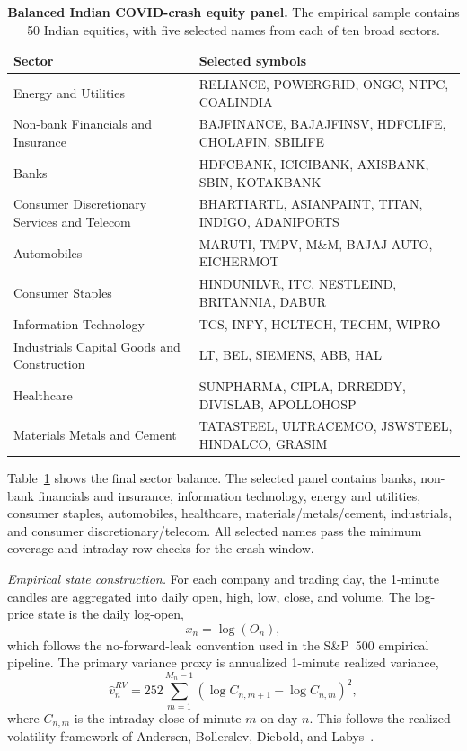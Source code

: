 \documentclass[reprint, amsmath, amssymb, aps, prl, superscriptaddress, nofootinbib]{revtex4-2}
\begin{document}
\begin{table}[t]
\centering
\caption{\textbf{Balanced Indian COVID-crash equity panel.}
The empirical sample contains 50 Indian equities, with five selected names from each of ten broad sectors.}
\label{tab:indian-company-selection}
\scriptsize
\begin{tabular}{ll}
\toprule
Sector & Selected symbols \\
\midrule
Energy and Utilities & RELIANCE, POWERGRID, ONGC, NTPC, COALINDIA \\
Non-bank Financials and Insurance & BAJFINANCE, BAJAJFINSV, HDFCLIFE, CHOLAFIN, SBILIFE \\
Banks & HDFCBANK, ICICIBANK, AXISBANK, SBIN, KOTAKBANK \\
Consumer Discretionary Services and Telecom & BHARTIARTL, ASIANPAINT, TITAN, INDIGO, ADANIPORTS \\
Automobiles & MARUTI, TMPV, M\&M, BAJAJ-AUTO, EICHERMOT \\
Consumer Staples & HINDUNILVR, ITC, NESTLEIND, BRITANNIA, DABUR \\
Information Technology & TCS, INFY, HCLTECH, TECHM, WIPRO \\
Industrials Capital Goods and Construction & LT, BEL, SIEMENS, ABB, HAL \\
Healthcare & SUNPHARMA, CIPLA, DRREDDY, DIVISLAB, APOLLOHOSP \\
Materials Metals and Cement & TATASTEEL, ULTRACEMCO, JSWSTEEL, HINDALCO, GRASIM \\
\bottomrule
\end{tabular}
\end{table}


Table~\ref{tab:indian-company-selection} shows the final sector balance. The selected panel contains banks, non-bank financials and insurance, information technology, energy and utilities, consumer staples, automobiles, healthcare, materials/metals/cement, industrials, and consumer discretionary/telecom. All selected names pass the minimum coverage and intraday-row checks for the crash window.



\textit{Empirical state construction.}
For each company and trading day, the 1-minute candles are aggregated into daily open, high, low, close, and volume. The log-price state is the daily log-open,
\begin{equation}
    x_n = \log(O_n),
\end{equation}
which follows the no-forward-leak convention used in the S\&P~500 empirical pipeline. The primary variance proxy is annualized 1-minute realized variance,
\begin{equation}
    \widehat{v}^{RV}_n
    =
    252\sum_{m=1}^{M_n-1}
    \left(\log C_{n,m+1} - \log C_{n,m}\right)^2,
\end{equation}
where $C_{n,m}$ is the intraday close of minute $m$ on day $n$. This follows the realized-volatility framework of Andersen, Bollerslev, Diebold, and Labys~\cite{AndersenEtAl2003}.
\end{document}
